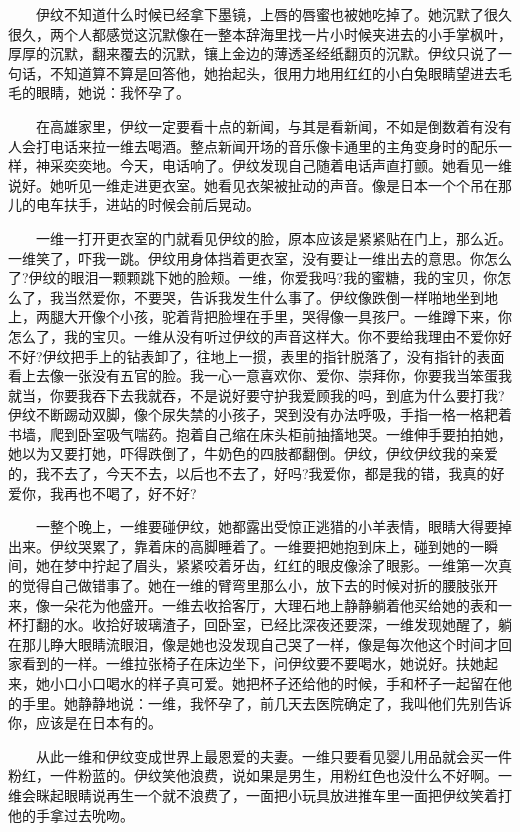 \documentclass[12pt,UTF8]{ctexbook}
\begin{document}
　　伊纹不知道什么时候已经拿下墨镜，上唇的唇蜜也被她吃掉了。她沉默了很久很久，两个人都感觉这沉默像在一整本辞海里找一片小时候夹进去的小手掌枫叶，厚厚的沉默，翻来覆去的沉默，镶上金边的薄透圣经纸翻页的沉默。伊纹只说了一句话，不知道算不算是回答他，她抬起头，很用力地用红红的小白兔眼睛望进去毛毛的眼睛，她说：我怀孕了。

　　在高雄家里，伊纹一定要看十点的新闻，与其是看新闻，不如是倒数着有没有人会打电话来拉一维去喝酒。整点新闻开场的音乐像卡通里的主角变身时的配乐一样，神采奕奕地。今天，电话响了。伊纹发现自己随着电话声直打颤。她看见一维说好。她听见一维走进更衣室。她看见衣架被扯动的声音。像是日本一个个吊在那儿的电车扶手，进站的时候会前后晃动。

　　一维一打开更衣室的门就看见伊纹的脸，原本应该是紧紧贴在门上，那么近。一维笑了，吓我一跳。伊纹用身体挡着更衣室，没有要让一维出去的意思。你怎么了?伊纹的眼泪一颗颗跳下她的脸颊。一维，你爱我吗?我的蜜糖，我的宝贝，你怎么了，我当然爱你，不要哭，告诉我发生什么事了。伊纹像跌倒一样啪地坐到地上，两腿大开像个小孩，驼着背把脸埋在手里，哭得像一具孩尸。一维蹲下来，你怎么了，我的宝贝。一维从没有听过伊纹的声音这样大。你不要给我理由不爱你好不好?伊纹把手上的钻表卸了，往地上一掼，表里的指针脱落了，没有指针的表面看上去像一张没有五官的脸。我一心一意喜欢你、爱你、崇拜你，你要我当笨蛋我就当，你要我吞下去我就吞，不是说好要守护我爱顾我的吗，到底为什么要打我?伊纹不断踢动双脚，像个尿失禁的小孩子，哭到没有办法呼吸，手指一格一格耙着书墙，爬到卧室吸气喘药。抱着自己缩在床头柜前抽搐地哭。一维伸手要拍拍她，她以为又要打她，吓得跌倒了，牛奶色的四肢都翻倒。伊纹，伊纹伊纹我的亲爱的，我不去了，今天不去，以后也不去了，好吗?我爱你，都是我的错，我真的好爱你，我再也不喝了，好不好?

　　一整个晚上，一维要碰伊纹，她都露出受惊正逃猎的小羊表情，眼睛大得要掉出来。伊纹哭累了，靠着床的高脚睡着了。一维要把她抱到床上，碰到她的一瞬间，她在梦中拧起了眉头，紧紧咬着牙齿，红红的眼皮像涂了眼影。一维第一次真的觉得自己做错事了。她在一维的臂弯里那么小，放下去的时候对折的腰肢张开来，像一朵花为他盛开。一维去收拾客厅，大理石地上静静躺着他买给她的表和一杯打翻的水。收拾好玻璃渣子，回卧室，已经比深夜还要深，一维发现她醒了，躺在那儿睁大眼睛流眼泪，像是她也没发现自己哭了一样，像是每次他这个时间才回家看到的一样。一维拉张椅子在床边坐下，问伊纹要不要喝水，她说好。扶她起来，她小口小口喝水的样子真可爱。她把杯子还给他的时候，手和杯子一起留在他的手里。她静静地说：一维，我怀孕了，前几天去医院确定了，我叫他们先别告诉你，应该是在日本有的。

　　从此一维和伊纹变成世界上最恩爱的夫妻。一维只要看见婴儿用品就会买一件粉红，一件粉蓝的。伊纹笑他浪费，说如果是男生，用粉红色也没什么不好啊。一维会眯起眼睛说再生一个就不浪费了，一面把小玩具放进推车里一面把伊纹笑着打他的手拿过去吮吻。
\end{document}
